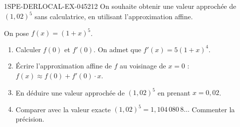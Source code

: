 \begin{exercice}{1SPE-DERLOCAL-EX-045}{2}{12}
On souhaite obtenir une valeur approchée de $(1{,}02)^5$ sans calculatrice, en utilisant l'approximation affine.

On pose $f(x) = (1+x)^5$.
\begin{enumerate}
\item Calculer $f(0)$ et $f'(0)$. On admet que $f'(x) = 5(1+x)^4$.
\item Écrire l'approximation affine de $f$ au voisinage de $x = 0$ : $f(x) \approx f(0) + f'(0) \cdot x$.
\item En déduire une valeur approchée de $(1{,}02)^5$ en prenant $x = 0{,}02$.
\item Comparer avec la valeur exacte $(1{,}02)^5 = 1{,}104\,080\,8\ldots$ Commenter la précision.
\end{enumerate}
\end{exercice}
